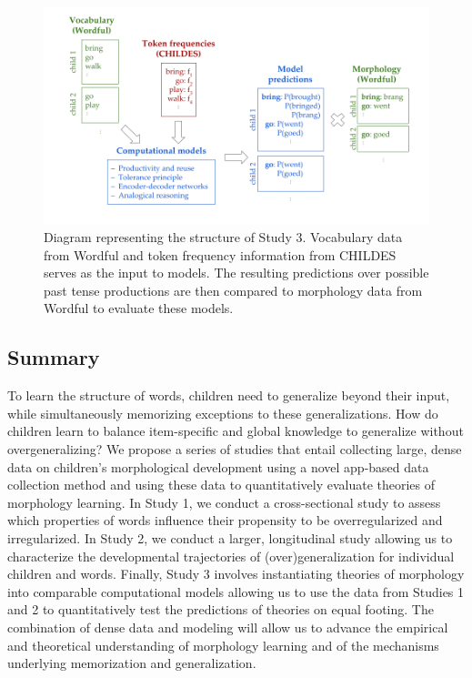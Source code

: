 \documentclass[
   11pt,
       ]{book}
\begin{document}
\begin{figure}

{\centering \includegraphics[width=\textwidth]{05-conclusion/sprf_diagram} 

}

\caption{Diagram representing the structure of Study 3. Vocabulary data from Wordful and token frequency information from CHILDES serves as the input to models. The resulting predictions over possible past tense productions are then compared to morphology data from Wordful to evaluate these models.}\label{fig:wordful-diagram}
\end{figure}

\hypertarget{wordful-summary}{%
\subsection{Summary}\label{wordful-summary}}

To learn the structure of words, children need to generalize beyond their input, while simultaneously memorizing exceptions to these generalizations. How do children learn to balance item-specific and global knowledge to generalize without overgeneralizing? We propose a series of studies that entail collecting large, dense data on children's morphological development using a novel app-based data collection method and using these data to quantitatively evaluate theories of morphology learning. In Study 1, we conduct a cross-sectional study to assess which properties of words influence their propensity to be overregularized and irregularized. In Study 2, we conduct a larger, longitudinal study allowing us to characterize the developmental trajectories of (over)generalization for individual children and words. Finally, Study 3 involves instantiating theories of morphology into comparable computational models allowing us to use the data from Studies 1 and 2 to quantitatively test the predictions of theories on equal footing. The combination of dense data and modeling will allow us to advance the empirical and theoretical understanding of morphology learning and of the mechanisms underlying memorization and generalization.

\renewcommand\bibname{References}
  
\end{document}
